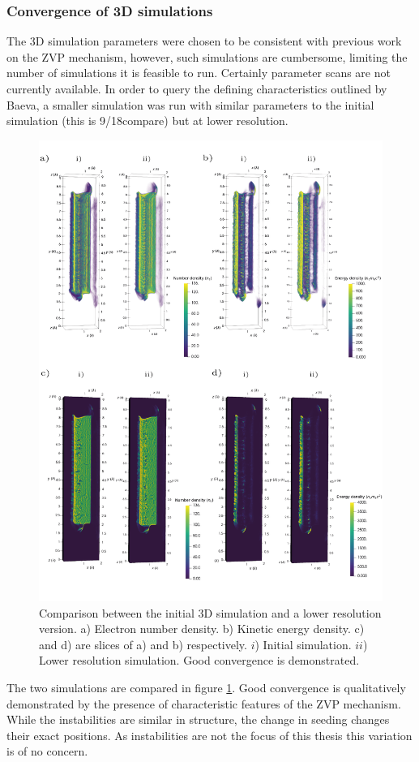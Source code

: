 \subsubsection{Convergence of 3D simulations}
The 3D simulation parameters were chosen to be consistent with previous work on the \ac{ZVP} mechanism, however, such simulations are cumbersome, limiting the number of simulations it is feasible to run. Certainly parameter scans are not currently available. In order to query the defining characteristics outlined by Baeva, a smaller simulation was run with similar parameters to the initial simulation (this is 9/18compare) but at lower resolution. 
\begin{figure}
	\centering
	\includegraphics[width=1\linewidth]{figures/zvp/zvp_3D_compare_lowres}
	\caption[Comparison between the initial 3D simulation and a lower resolution version.]{Comparison between the initial 3D simulation and a lower resolution version. a) Electron number density. b) Kinetic energy density. c) and d) are slices of a) and b) respectively. $i$) Initial simulation. $ii$) Lower resolution simulation. Good convergence is demonstrated.}
	\label{fig:zvp3dcomparelowres}
\end{figure}
The two simulations are compared in figure \ref{fig:zvp3dcomparelowres}. Good convergence is qualitatively demonstrated by the presence of characteristic features of the ZVP mechanism. While the instabilities are similar in structure, the change in seeding changes their exact positions. As instabilities are not the focus of this thesis this variation is of no concern.


